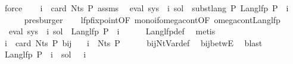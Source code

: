\begin{isabellebody}
\ force\isanewline
\ \ \isamarkupfalse%
\ {\isacartoucheopen}i\ {\isacharless}{\kern0pt}\ card\ {\isacharparenleft}{\kern0pt}Nts\ P{\isacharparenright}{\kern0pt}{\isacartoucheclose}\ assms\ \isamarkupfalse%
\ {\isachardoublequoteopen}eval\ {\isacharparenleft}{\kern0pt}sys\ {\isacharbang}{\kern0pt}\ i{\isacharparenright}{\kern0pt}\ sol\ {\isacharequal}{\kern0pt}\ subst{\isacharunderscore}{\kern0pt}lang\ P\ {\isacharparenleft}{\kern0pt}Lang{\isacharunderscore}{\kern0pt}lfp\ P{\isacharparenright}{\kern0pt}\ {\isacharparenleft}{\kern0pt}{\isasymgamma}\ i{\isacharparenright}{\kern0pt}{\isachardoublequoteclose}\isanewline
\ \ \ \ \isamarkupfalse%
\ presburger\isanewline
\ \ \isamarkupfalse%
\ lfp{\isacharunderscore}{\kern0pt}fixpoint{\isacharbrackleft}{\kern0pt}OF\ mono{\isacharunderscore}{\kern0pt}if{\isacharunderscore}{\kern0pt}omega{\isacharunderscore}{\kern0pt}cont{\isacharbrackleft}{\kern0pt}OF\ omega{\isacharunderscore}{\kern0pt}cont{\isacharunderscore}{\kern0pt}Lang{\isacharunderscore}{\kern0pt}lfp{\isacharbrackright}{\kern0pt}{\isacharbrackright}{\kern0pt}\ \isamarkupfalse%
\ {}{\isacharcolon}{\kern0pt}\ {\isachardoublequoteopen}eval\ {\isacharparenleft}{\kern0pt}sys\ {\isacharbang}{\kern0pt}\ i{\isacharparenright}{\kern0pt}\ sol\ {\isacharequal}{\kern0pt}\ Lang{\isacharunderscore}{\kern0pt}lfp\ P\ {\isacharparenleft}{\kern0pt}{\isasymgamma}\ i{\isacharparenright}{\kern0pt}{\isachardoublequoteclose}\isanewline
\ \ \ \ \isamarkupfalse%
\ Lang{\isacharunderscore}{\kern0pt}lfp{\isacharunderscore}{\kern0pt}def\ \isamarkupfalse%
\ metis\isanewline
\ \ \isamarkupfalse%
\ {\isacartoucheopen}i\ {\isacharless}{\kern0pt}\ card\ {\isacharparenleft}{\kern0pt}Nts\ P{\isacharparenright}{\kern0pt}{\isacartoucheclose}\ bij{\isacharunderscore}{\kern0pt}{\isasymgamma}{\isacharunderscore}{\kern0pt}{\isasymgamma}{\isacharprime}{\kern0pt}\ \isamarkupfalse%
\ {\isachardoublequoteopen}{\isasymgamma}\ i\ {\isasymin}\ Nts\ P{\isachardoublequoteclose}\isanewline
\ \ \ \ \isamarkupfalse%
\ bij{\isacharunderscore}{\kern0pt}Nt{\isacharunderscore}{\kern0pt}Var{\isacharunderscore}{\kern0pt}def\ \isamarkupfalse%
\ bij{\isacharunderscore}{\kern0pt}betwE\ \isamarkupfalse%
\ blast\isanewline
\ \ \isamarkupfalse%
\ {\isacharasterisk}{\kern0pt}\ \isamarkupfalse%
\ {\isachardoublequoteopen}Lang{\isacharunderscore}{\kern0pt}lfp\ P\ {\isacharparenleft}{\kern0pt}{\isasymgamma}\ i{\isacharparenright}{\kern0pt}\ {\isacharequal}{\kern0pt}\ sol\ {\isacharparenleft}{\kern0pt}{\isasymgamma}{\isacharprime}{\kern0pt}\ {\isacharparenleft}{\kern0pt}{\isasymgamma}\ i{\isacharparenright}{\kern0pt}{\isacharparenright}{\kern0pt}{\isachardoublequoteclose}\ \isamarkupfalse%

\end{isabellebody}
